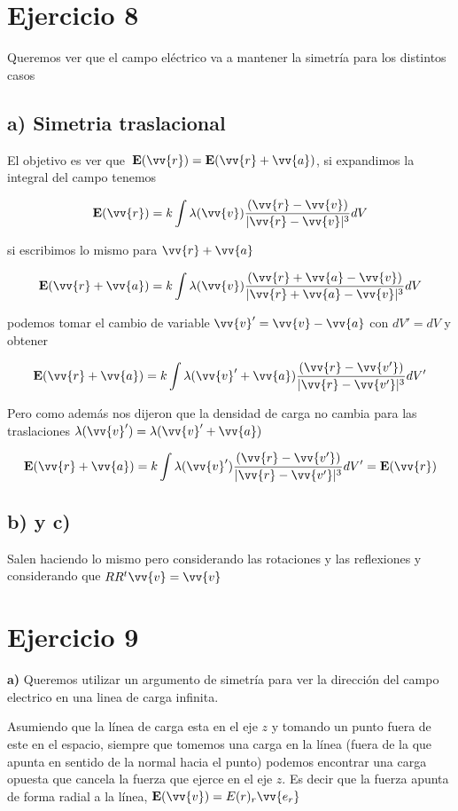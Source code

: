 \documentclass[leqno, 12pt, twoside, letterpaper]{book}
\def\efield{\textbf{E}}
\begin{document}
\section*{Ejercicio 8}

Queremos ver que el campo eléctrico va a mantener la simetría para los distintos casos

\subsection*{a) Simetria traslacional}

El objetivo es ver que  $\,\efield(\vv{r}) = \efield(\vv{r} + \vv{a})$, si expandimos la integral del campo tenemos

\[ \efield(\vv{r}) = k \int \lambda(\vv{v}) \dfrac{(\vv{r} - \vv{v})}{|\vv{r} - \vv{v}|^3} dV \]

\noindent si escribimos lo mismo para $\vv{r} + \vv{a}$ 


\[ \efield(\vv{r} + \vv{a}) = k \int \lambda(\vv{v}) \dfrac{(\vv{r} + \vv{a} - \vv{v})}{|\vv{r} + \vv{a} - \vv{v}|^3} dV \]

\noindent podemos tomar el cambio de variable $\vv{v}' = \vv{v} - \vv{a} $ con $dV' =  dV $ y obtener 


\[ \efield(\vv{r} + \vv{a}) = k \int \lambda(\vv{v}' + \vv{a}) \dfrac{(\vv{r} - \vv{v'})}{|\vv{r} - \vv{v'}|^3} dV' \]

\noindent Pero como además nos dijeron que la densidad de carga no cambia para las traslaciones $\lambda(\vv{v}') = \lambda(\vv{v}'+\vv{a})$

$$ \efield(\vv{r} + \vv{a}) = k \int \lambda(\vv{v}') \dfrac{(\vv{r} - \vv{v'})}{|\vv{r} - \vv{v'}|^3} dV' =  \efield(\vv{r})
$$

\subsection*{b) y c)} 

Salen haciendo lo mismo pero considerando las rotaciones y las reflexiones y considerando que $ R R^t \vv{v} = \vv{v}$

\section*{Ejercicio 9}

\textbf{a)} Queremos utilizar un argumento de simetría para ver la dirección del campo electrico en una linea de carga infinita.

Asumiendo que la línea de carga esta en el eje $z$ y tomando un punto fuera de este en el espacio, siempre que tomemos una carga en la línea (fuera de la que apunta en sentido de la normal hacia el punto) podemos encontrar una carga opuesta que cancela la fuerza que ejerce en el eje $z$. Es decir que la fuerza apunta de forma radial a la línea, $\efield(\vv{v}) = E(r)_r \vv{e_r} $
\end{document}
